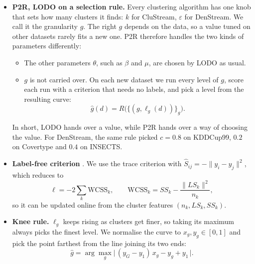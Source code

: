 \begin{enumerate}[label=\textbf{C\arabic*.},leftmargin=2.2em]
\begin{itemize}[leftmargin=1.2em,itemsep=3pt,topsep=2pt]
    \item \textbf{P2R, LODO on a selection rule.} Every clustering algorithm has one knob that sets how many clusters it finds: $k$ for CluStream, $\varepsilon$ for DenStream. We call it the granularity $g$. The right $g$ depends on the data, so a value tuned on other datasets rarely fits a new one. P2R therefore handles the two kinds of parameters differently:
    \begin{itemize}[leftmargin=1.2em,itemsep=1pt]
      \item The other parameters $\theta$, such as $\beta$ and $\mu$, are chosen by LODO as usual.
      \item $g$ is not carried over. On each new dataset we run every level of $g$, score each run with a criterion that needs no labels, and pick a level from the resulting curve:
      \[
        \hat g(d) = R\big(\{(g, \ell_g(d))\}_{g}\big).
      \]
    \end{itemize}
    In short, LODO hands over a value, while P2R hands over a way of choosing the value. For DenStream, the same rule picked $c = 0.8$ on KDDCup99, $0.2$ on Covertype and $0.4$ on INSECTS.

    \item \textbf{Label-free criterion} \cite{fan2020hyperparameter}. We use the trace criterion with $\hat S_{ij} = -\lVert y_i - y_j\rVert^2$, which reduces to
    \[
      \ell = -2\sum_k \mathrm{WCSS}_k, \qquad \mathrm{WCSS}_k = SS_k - \frac{\lVert LS_k\rVert^2}{n_k},
    \]
    so it can be updated online from the cluster features $(n_k, LS_k, SS_k)$.

    \item \textbf{Knee rule.} $\ell_g$ keeps rising as clusters get finer, so taking its maximum always picks the finest level. We normalise the curve to $x_g, y_g \in [0,1]$ and pick the point farthest from the line joining its two ends:
    \[
      \hat g = \arg\max_g \big|\, (y_G - y_1)\,x_g - y_g + y_1 \,\big|.
    \]
  \end{itemize}


\end{enumerate}
